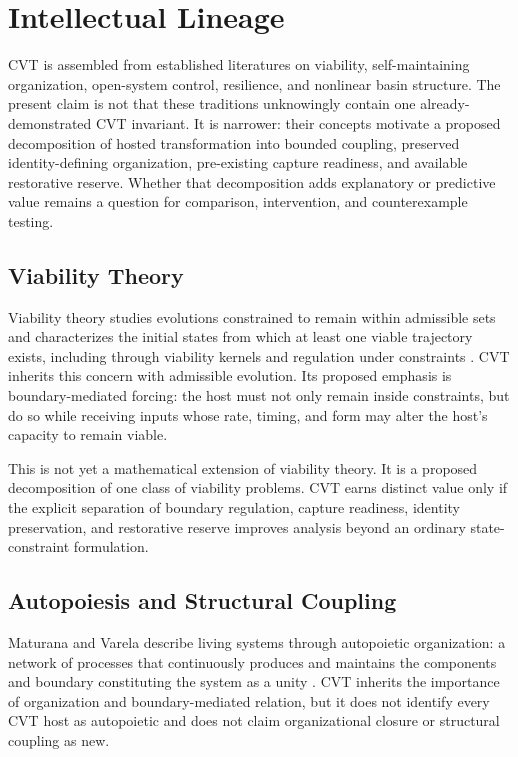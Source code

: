 
\section{Intellectual Lineage}
\label{sec:lineage}

CVT is assembled from established literatures on viability, self-maintaining organization, open-system control, resilience, and nonlinear basin structure. The present claim is not that these traditions unknowingly contain one already-demonstrated CVT invariant. It is narrower: their concepts motivate a proposed decomposition of hosted transformation into bounded coupling, preserved identity-defining organization, pre-existing capture readiness, and available restorative reserve. Whether that decomposition adds explanatory or predictive value remains a question for comparison, intervention, and counterexample testing.

\subsection{Viability Theory}

Viability theory studies evolutions constrained to remain within admissible sets and characterizes the initial states from which at least one viable trajectory exists, including through viability kernels and regulation under constraints \cite{aubin2011}. CVT inherits this concern with admissible evolution. Its proposed emphasis is boundary-mediated forcing: the host must not only remain inside constraints, but do so while receiving inputs whose rate, timing, and form may alter the host's capacity to remain viable.

This is not yet a mathematical extension of viability theory. It is a proposed decomposition of one class of viability problems. CVT earns distinct value only if the explicit separation of boundary regulation, capture readiness, identity preservation, and restorative reserve improves analysis beyond an ordinary state-constraint formulation.

\subsection{Autopoiesis and Structural Coupling}

Maturana and Varela describe living systems through autopoietic organization: a network of processes that continuously produces and maintains the components and boundary constituting the system as a unity \cite{maturana1980}. CVT inherits the importance of organization and boundary-mediated relation, but it does not identify every CVT host as autopoietic and does not claim organizational closure or structural coupling as new.

